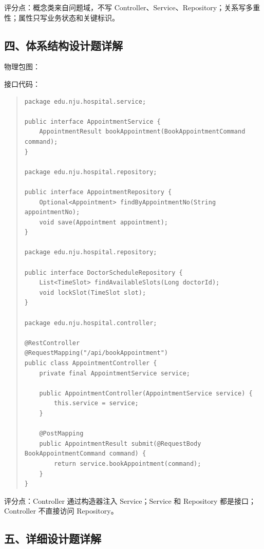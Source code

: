 \documentclass[UTF8,zihao=-4]{ctexart}
\begin{document}
评分点：概念类来自问题域，不写 Controller、Service、Repository；关系写多重性；属性只写业务状态和关键标识。


\subsection{四、体系结构设计题详解}


物理包图：





接口代码：


\begin{quote}
\footnotesize
\begin{verbatim}
package edu.nju.hospital.service;

public interface AppointmentService {
    AppointmentResult bookAppointment(BookAppointmentCommand command);
}

package edu.nju.hospital.repository;

public interface AppointmentRepository {
    Optional<Appointment> findByAppointmentNo(String appointmentNo);
    void save(Appointment appointment);
}

package edu.nju.hospital.repository;

public interface DoctorScheduleRepository {
    List<TimeSlot> findAvailableSlots(Long doctorId);
    void lockSlot(TimeSlot slot);
}

package edu.nju.hospital.controller;

@RestController
@RequestMapping("/api/bookAppointment")
public class AppointmentController {
    private final AppointmentService service;

    public AppointmentController(AppointmentService service) {
        this.service = service;
    }

    @PostMapping
    public AppointmentResult submit(@RequestBody BookAppointmentCommand command) {
        return service.bookAppointment(command);
    }
}
\end{verbatim}
\end{quote}



评分点：Controller 通过构造器注入 Service；Service 和 Repository 都是接口；Controller 不直接访问 Repository。


\subsection{五、详细设计题详解}
\end{document}
